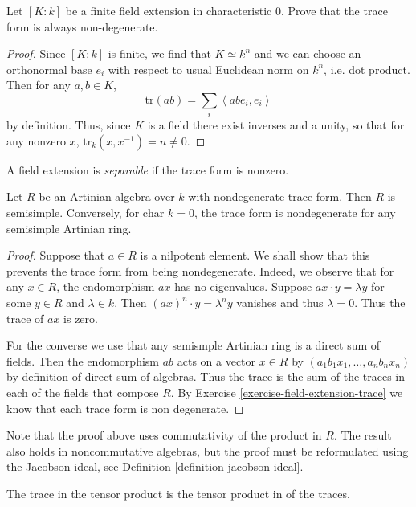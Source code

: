 \begin{exercise}
\label{exercise-field-extension-trace}
Let $[K:k]$ be a finite field extension
in characteristic 0.
Prove that the trace form is always
non-degenerate.
\end{exercise}

\begin{proof}
Since $[K:k]$ is finite,
we find that $K \simeq k^n$
and we can choose an orthonormal
base $e_i$ with respect to usual
Euclidean norm on $k^n$, i.e. dot product.
Then for any $a,b \in K$,
$$
\text{tr}(ab)=
\sum_i\left\langle{}abe_i,e_i\right\rangle{}
$$
by definition. Thus, since $K$ is a field
there exist inverses and a unity, so that
for any nonzero $x$,
$\text{tr}_k(x,x^{-1})=n \neq 0$.
\end{proof}

\begin{definition}
\label{definition-separable-field-extension}
A field extension is {\it separable}
if the trace form is nonzero.
\end{definition}

\begin{theorem}
\label{theorem-nonde-trace-semis}
Let $R$ be an Artinian algebra over $k$
with nondegenerate trace form.
Then $R$ is semisimple.
Conversely, for $\text{char }k=0$,
the trace form is nondegenerate
for any semisimple Artinian ring.
\end{theorem}

\begin{proof}
Suppose that $a \in R$ is a nilpotent
element. We shall show that this prevents
the trace form from being nondegenerate.
Indeed, we observe that for any $x \in R$,
the endomorphism $ax$ has no eigenvalues.
Suppose $ax\cdot y=\lambda y$ for some
$y \in R$ and $\lambda \in k$.
Then $(ax)^n\cdot y = \lambda^n y$
vanishes and thus $\lambda=0$.
Thus the trace of $ax$ is zero.

For the converse we use that any semismple
Artinian ring is a direct sum of fields.
Then the endomorphism $ab$ acts on
a vector $x \in R$ by
$(a_1b_1x_1,…,a_nb_nx_n)$
by definition of direct sum of algebras.
Thus the trace is the sum of
the traces in each of the fields that compose
$R$. By Exercise
\ref{exercise-field-extension-trace}
we know that each trace form is non
degenerate.
\end{proof}

\noindent
Note that the proof above uses
commutativity of the product in $R$.
The result also holds in noncommutative
algebras, but the proof must be reformulated
using the Jacobson ideal,
see Definition
\ref{definition-jacobson-ideal}.
\begin{lemma}
\label{lemma-trace-and-tensor-product}
The trace in the tensor product
is the tensor product in of the traces.
\end{lemma}

